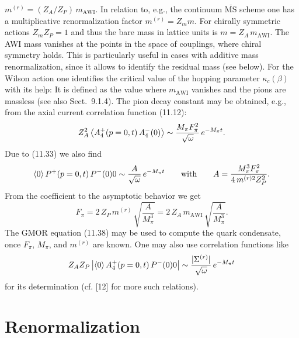 $m^{(r)} = (Z_A / Z_P)\, m_{\mathrm{AWI}}$. In relation to, e.g., the continuum $\overline{\mathrm{MS}}$ scheme one has
a multiplicative renormalization factor $m^{(r)} = Z_m m$. For chirally symmetric
actions $Z_m Z_P = 1$ and thus the bare mass in lattice units is $m = Z_A\, m_{\mathrm{AWI}}$.
The AWI mass vanishes at the points in the space of couplings, where
chiral symmetry holds. This is particularly useful in cases with additive mass
renormalization, since it allows to identify the residual mass (see below). For
the Wilson action one identifies the critical value of the hopping parameter
$\kappa_c(\beta)$ with its help: It is defined as the value where $m_{\mathrm{AWI}}$ vanishes and the
pions are massless (see also Sect.~9.1.4).
The pion decay constant may be obtained, e.g., from the axial current
correlation function (11.12):
\begin{equation}
Z_A^2 \left\langle A_4^+(p = 0, t)\, A_4^-(0) \right\rangle \sim \frac{M_\pi F_\pi^2}{\sqrt{\omega}}\, e^{-M_\pi t} .
\end{equation}
Due to (11.33) we also find
\begin{equation}
\left\langle 0 \right\rangle{P^+(p = 0, t)\,P^-(0)}{0} \sim \frac{A}{\sqrt{\omega}}\, e^{-M_\pi t}
\qquad\text{with}\qquad
A = \frac{M_\pi^3 F_\pi^2}{4\,m^{(r)2} Z_P^2} .
\end{equation}
From the coefficient to the asymptotic behavior we get
\begin{equation}
F_\pi = 2\,Z_P\, m^{(r)}\, \sqrt{\frac{A}{M_\pi^3}}
= 2\,Z_A\, m_{\mathrm{AWI}}\, \sqrt{\frac{A}{M_\pi^3}} .
\end{equation}
The GMOR equation (11.38) may be used to compute the quark condensate, once $F_\pi$, $M_\pi$, and $m^{(r)}$ are known. One may also use correlation functions
like
\begin{equation}
Z_A Z_P\, \bigl|\left\langle 0 \right\rangle{A_4^+(p = 0, t)\,P^-(0)}{0}\bigr| \sim \frac{|\Sigma^{(r)}|}{\sqrt{\omega}}\, e^{-M_\pi t}
\end{equation}
for its determination (cf. [12] for more such relations).

\section{Renormalization}
\label{sec:renorm}
